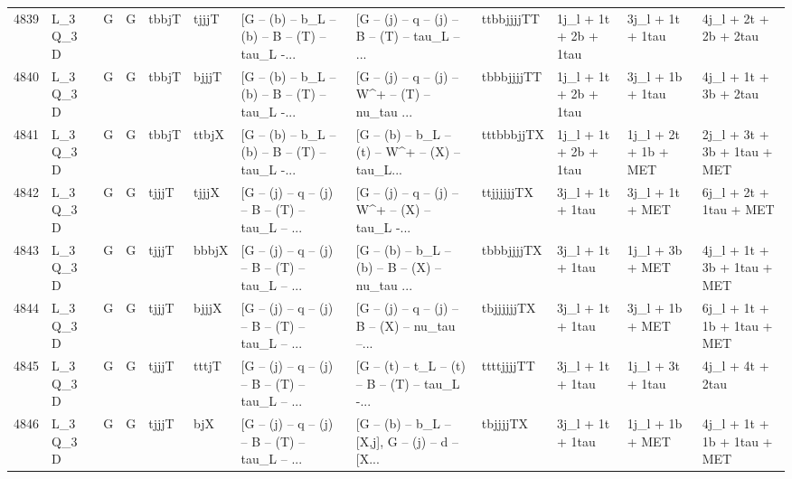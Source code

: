 \begin{tabular}{llllllllllll}
4839 &    L\_3 Q\_3 D &     G &     G &       tbbjT &       tjjjT &  [G -- (b) -- b\_L -- (b) -- B -- (T) -- tau\_L -... &  [G -- (j) -- q -- (j) -- B -- (T) -- tau\_L -- ... &  ttbbjjjjTT &    1j\_l + 1t + 2b + 1tau &         3j\_l + 1t + 1tau &              4j\_l + 2t + 2b + 2tau \\
4840 &    L\_3 Q\_3 D &     G &     G &       tbbjT &       bjjjT &  [G -- (b) -- b\_L -- (b) -- B -- (T) -- tau\_L -... &  [G -- (j) -- q -- (j) -- W\textasciicircum + -- (T) -- nu\_tau ... &  tbbbjjjjTT &    1j\_l + 1t + 2b + 1tau &         3j\_l + 1b + 1tau &              4j\_l + 1t + 3b + 2tau \\
4841 &    L\_3 Q\_3 D &     G &     G &       tbbjT &       ttbjX &  [G -- (b) -- b\_L -- (b) -- B -- (T) -- tau\_L -... &  [G -- (b) -- b\_L -- (t) -- W\textasciicircum + -- (X) -- tau\_L... &  tttbbbjjTX &    1j\_l + 1t + 2b + 1tau &     1j\_l + 2t + 1b + MET &        2j\_l + 3t + 3b + 1tau + MET \\
4842 &    L\_3 Q\_3 D &     G &     G &       tjjjT &       tjjjX &  [G -- (j) -- q -- (j) -- B -- (T) -- tau\_L -- ... &  [G -- (j) -- q -- (j) -- W\textasciicircum + -- (X) -- tau\_L -... &  ttjjjjjjTX &         3j\_l + 1t + 1tau &          3j\_l + 1t + MET &             6j\_l + 2t + 1tau + MET \\
4843 &    L\_3 Q\_3 D &     G &     G &       tjjjT &       bbbjX &  [G -- (j) -- q -- (j) -- B -- (T) -- tau\_L -- ... &  [G -- (b) -- b\_L -- (b) -- B -- (X) -- nu\_tau ... &  tbbbjjjjTX &         3j\_l + 1t + 1tau &          1j\_l + 3b + MET &        4j\_l + 1t + 3b + 1tau + MET \\
4844 &    L\_3 Q\_3 D &     G &     G &       tjjjT &       bjjjX &  [G -- (j) -- q -- (j) -- B -- (T) -- tau\_L -- ... &  [G -- (j) -- q -- (j) -- B -- (X) -- nu\_tau --... &  tbjjjjjjTX &         3j\_l + 1t + 1tau &          3j\_l + 1b + MET &        6j\_l + 1t + 1b + 1tau + MET \\
4845 &    L\_3 Q\_3 D &     G &     G &       tjjjT &       tttjT &  [G -- (j) -- q -- (j) -- B -- (T) -- tau\_L -- ... &  [G -- (t) -- t\_L -- (t) -- B -- (T) -- tau\_L -... &  ttttjjjjTT &         3j\_l + 1t + 1tau &         1j\_l + 3t + 1tau &                   4j\_l + 4t + 2tau \\
4846 &    L\_3 Q\_3 D &     G &     G &       tjjjT &         bjX &  [G -- (j) -- q -- (j) -- B -- (T) -- tau\_L -- ... &  [G -- (b) -- b\_L -- [X,j], G -- (j) -- d -- [X... &    tbjjjjTX &         3j\_l + 1t + 1tau &          1j\_l + 1b + MET &        4j\_l + 1t + 1b + 1tau + MET \\

\end{tabular}
